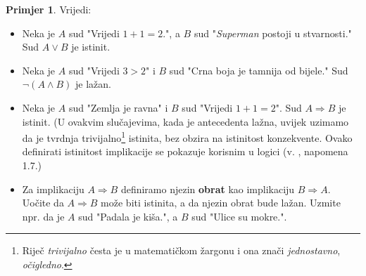 \documentclass{book}
\theoremstyle{definition}
\theoremstyle{definition}
\newtheorem{exmp}{Primjer}
\theoremstyle{remark}
\begin{document}
\begin{exmp} Vrijedi:
\label{16}
\begin{itemize}
\item Neka je $A$ sud "Vrijedi $1+1=2$.", a $B$ sud "\textit{Superman} postoji u stvarnosti." Sud $A\vee B$ je istinit.
\item Neka je $A$ sud "Vrijedi $3>2$" i $B$ sud "Crna boja je tamnija od bijele." Sud $\neg(A\wedge B)$ je lažan.
\item Neka je $A$ sud "Zemlja je ravna" i $B$ sud "Vrijedi $1+1=2$". Sud $A\Rightarrow B$ je istinit. (U ovakvim slučajevima, kada je antecedenta lažna, uvijek uzimamo da je tvrdnja trivijalno\footnote{Riječ \textit{trivijalno} česta je u matematičkom žargonu i ona znači \textit{jednostavno}, \textit{očigledno}.} istinita, bez obzira na istinitost konzekvente. Ovako definirati istinitost implikacije se pokazuje korisnim u logici (v. \cite{1}, napomena 1.7.)
\item Za implikaciju $A\Rightarrow B$ definiramo njezin \textbf{obrat} kao implikaciju $B\Rightarrow A$. Uočite da $A\Rightarrow B$ može biti istinita, a da njezin obrat bude lažan. Uzmite npr. da je $A$ sud "Padala je kiša.", a $B$ sud "Ulice su mokre.".
\end{itemize}
\end{exmp}
\end{document}
